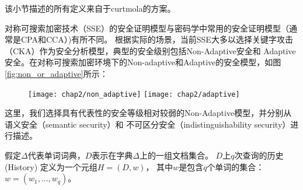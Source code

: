 

该小节描述的所有定义来自于curtmola的方案\cite{curtmola2006searchable}。

对称可搜索加密技术（SSE）的安全证明模型与密码学中常用的安全证明模型（通常是CPA和CCA）)有所不同。
根据实际的场景，当前SSE大多以选择关键字攻击（CKA）作为安全分析模型，典型的安全级别包括Non-Adaptive安全和
Adaptive安全。在对称可搜索加密环境下的Non-adaptive和Adaptive的安全模型，如图\ref{fig:non_or_adaptive}所示：

\begin{figure}[!htp]
  \centering
  \texttt{[image: chap2/non\_adaptive]}
  \hspace{1cm}
  \texttt{[image: chap2/adaptive]}
\end{figure}

这里，我们选择具有代表性的安全等级相对较弱的Non-Adaptive模型，并分别从语义安全（semantic security）和
不可区分安全（indistinguishability security）进行描述。




\begin{defn}[History]
\label{defn:attack_history}

假定$\Delta$代表单词词典，$D$表示在字典$\Delta$上的一组文档集合。
$D$上$q$次查询的历史(History) 定义为一个元组$H = (D,w)$，
其中$w$是包含$q$个单词的集合：$w = (w_1,...,w_q)$。

\end{defn}


